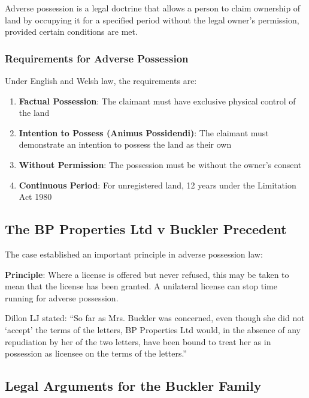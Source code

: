 \documentclass[11pt,a4paper]{article}
\begin{document}
Adverse possession is a legal doctrine that allows a person to claim ownership of land by occupying it for a specified period without the legal owner's permission, provided certain conditions are met.

\subsubsection{Requirements for Adverse Possession}

Under English and Welsh law, the requirements are:

\begin{enumerate}[label=\arabic*.]
    \item \textbf{Factual Possession}: The claimant must have exclusive physical control of the land
    \item \textbf{Intention to Possess (Animus Possidendi)}: The claimant must demonstrate an intention to possess the land as their own
    \item \textbf{Without Permission}: The possession must be without the owner's consent
    \item \textbf{Continuous Period}: For unregistered land, 12 years under the Limitation Act 1980
\end{enumerate}

\subsection{The BP Properties Ltd v Buckler Precedent}

The case established an important principle in adverse possession law:

\begin{keyfact}
\textbf{Principle}: Where a license is offered but never refused, this may be taken to mean that the license has been granted. A unilateral license can stop time running for adverse possession.
\end{keyfact}

Dillon LJ stated: ``So far as Mrs. Buckler was concerned, even though she did not `accept' the terms of the letters, BP Properties Ltd would, in the absence of any repudiation by her of the two letters, have been bound to treat her as in possession as licensee on the terms of the letters.''

\subsection{Legal Arguments for the Buckler Family}
\end{document}
